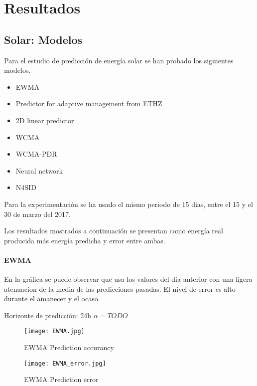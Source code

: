 \chapter{Resultados} 
\label{cha:resultados}



\section{Solar: Modelos}

Para el estudio de predicción de energía solar se han probado los siguientes modelos.

\begin{itemize}
    \item EWMA
    \item Predictor for adaptive management from ETHZ
    \item 2D linear predictor
    \item WCMA
    \item WCMA-PDR
    \item Neural network
    \item N4SID
\end{itemize}

Para la experimentación se ha usado el mismo periodo de 15 dias, entre el 15 y el 30 de marzo del 2017.

Los resultados mostrados a continuación se presentan como energía real producida más energía predicha y error entre ambas.


\subsubsection{EWMA}
\label{ssub:ewma}

En la gráfica se puede observar que usa los valores del dia anterior con una ligera atenuacion de la media de las predicciones pasadas. El nivel de error es alto durante el amanecer y el ocaso.

Horizonte de predicción: 24h
$\alpha = TODO$

\begin{figure}[h]
    \texttt{[image: EWMA.jpg]}
    \caption{EWMA Prediction accurancy}
    \label{fig:ewma_comp}
\end{figure}

\begin{figure}[h]
    \texttt{[image: EWMA\_error.jpg]}
    \caption{EWMA Prediction error}
    \label{fig:ewma_error}
\end{figure}


